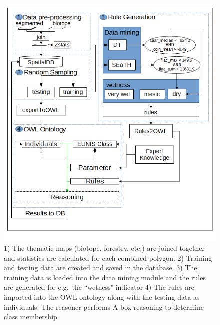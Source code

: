 \documentclass[authoryear, review,12pt,number]{elsarticle}
\begin{document}
\begin{figure}
\includegraphics[width=1\linewidth]{diagrams/another_workflow_diagram_large.png}
\caption
    {
        1) The thematic maps (biotope, forestry, etc.) are joined together and
        statistics are calculated for each combined polygon.
        2) Training and testing data are created and saved in the database.
        3) The training data is loaded into the data mining module and the
        rules are generated for e.g.\ the ``wetness" indicator
        4) The rules are imported into the OWL ontology along with the testing
        data as individuals. The reasoner performs A-box reasoning to determine
        class membership.
    } 
\label{fig_full_workflow}
\end{figure}
\end{document}
